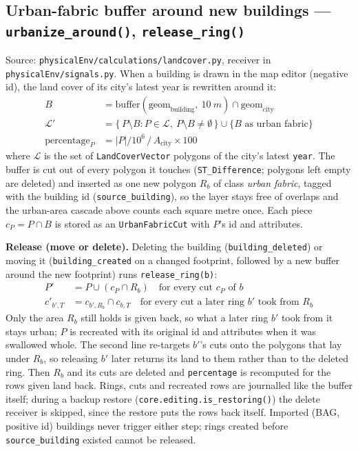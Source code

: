\documentclass[11pt]{article}
\newcommand{\code}[1]{\texttt{#1}}
\begin{document}
\subsection{Urban-fabric buffer around new buildings --- \code{urbanize\_around()}, \code{release\_ring()}}
\label{sec:urban-fabric-buffer}
Source: \code{physicalEnv/calculations/landcover.py}, receiver in \code{physicalEnv/signals.py}. When a building is drawn in the map editor (negative id), the land cover of its city's latest year is rewritten around it:
\begin{align}
  B &= \mathrm{buffer}(\mathrm{geom}_{\text{building}},\ 10\ \si{m}) \cap \mathrm{geom}_{\text{city}} \\
  \mathcal{L}' &= \{\, P \setminus B : P \in \mathcal{L},\ P \setminus B \neq \emptyset \,\} \cup \{ B \text{ as urban fabric} \} \\
  \mathrm{percentage}_P &= |P| / 10^6 \,/\, A_{\text{city}} \times 100
\end{align}
where $\mathcal{L}$ is the set of \code{LandCoverVector} polygons of the city's latest \code{year}. The buffer is cut out of every polygon it touches (\code{ST\_Difference}; polygons left empty are deleted) and inserted as one new polygon $R_b$ of class \emph{urban fabric}, tagged with the building id (\code{source\_building}), so the layer stays free of overlaps and the urban-area cascade above counts each square metre once. Each piece $c_P = P \cap B$ is stored as an \code{UrbanFabricCut} with $P$'s id and attributes.

\textbf{Release (move or delete).} Deleting the building (\code{building\_deleted}) or moving it (\code{building\_created} on a changed footprint, followed by a new buffer around the new footprint) runs \code{release\_ring(b)}:
\begin{align}
  P' &= P \cup (c_P \cap R_b) \quad \text{for every cut } c_P \text{ of } b \\
  c'_{b',T} &= c_{b',R_b} \cap c_{b,T} \quad \text{for every cut a later ring } b' \text{ took from } R_b
\end{align}
Only the area $R_b$ still holds is given back, so what a later ring $b'$ took from it stays urban; $P$ is recreated with its original id and attributes when it was swallowed whole. The second line re-targets $b'$'s cuts onto the polygons that lay under $R_b$, so releasing $b'$ later returns its land to them rather than to the deleted ring. Then $R_b$ and its cuts are deleted and \code{percentage} is recomputed for the rows given land back. Rings, cuts and recreated rows are journalled like the buffer itself; during a backup restore (\code{core.editing.is\_restoring()}) the delete receiver is skipped, since the restore puts the rows back itself. Imported (BAG, positive id) buildings never trigger either step; rings created before \code{source\_building} existed cannot be released.
\end{document}
